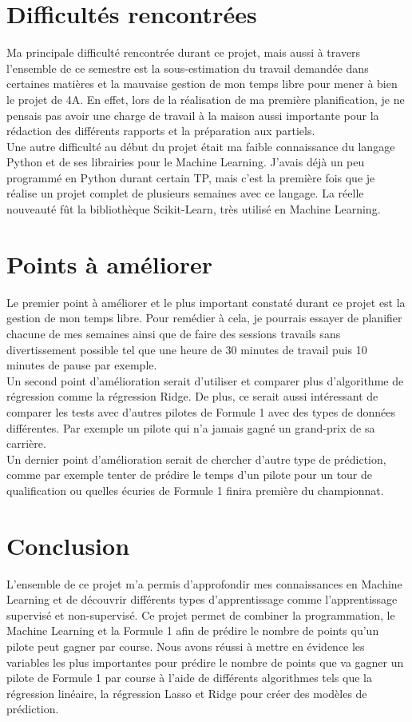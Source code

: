 \chapter{Difficultés rencontrées}
Ma principale difficulté rencontrée durant ce projet, mais aussi à travers l'ensemble de ce semestre est la sous-estimation du travail demandée dans certaines matières et la mauvaise gestion de mon temps libre pour mener à bien le projet de 4A. En effet, lors de la réalisation de ma première planification, je ne pensais pas avoir une charge de travail à la maison aussi importante pour la rédaction des différents rapports et la préparation aux partiels.\\ 

Une autre difficulté au début du projet était ma faible connaissance du langage Python et de ses librairies pour le Machine Learning. J'avais déjà un peu programmé en Python durant certain TP, mais c'est la première fois que je réalise un projet complet de plusieurs semaines avec ce langage. La réelle nouveauté fût la bibliothèque Scikit-Learn, très utilisé en Machine Learning. \\

\chapter{Points à améliorer}
Le premier point à améliorer et le plus important constaté durant ce projet est la gestion de mon temps libre. Pour remédier à cela, je pourrais essayer de planifier chacune de mes semaines ainsi que de faire des sessions travails sans divertissement possible tel que une heure de 30 minutes de travail puis 10 minutes de pause par exemple.\\

Un second point d'amélioration serait d'utiliser et comparer plus d'algorithme de régression comme la régression Ridge. De plus, ce serait aussi intéressant de comparer les tests avec d'autres pilotes de Formule 1 avec des types de données différentes. Par exemple un pilote qui n'a jamais gagné un grand-prix de sa carrière. \\

Un dernier point d'amélioration serait de chercher d'autre type de prédiction, comme par exemple tenter de prédire le temps d'un pilote pour un tour de qualification ou quelles écuries de Formule 1 finira première du championnat.



\chapter{Conclusion}
L'ensemble de ce projet m'a permis d'approfondir mes connaissances en Machine Learning et de découvrir différents types d'apprentissage comme l'apprentissage supervisé et non-supervisé. Ce projet permet de combiner la programmation, le Machine Learning et la Formule 1 afin de prédire le nombre de points qu'un pilote peut gagner par course. Nous avons réussi à mettre en évidence les variables les plus importantes pour prédire le nombre de points que va gagner un pilote de Formule 1 par course à l'aide de différents algorithmes tels que la régression linéaire, la régression Lasso et Ridge pour créer des modèles de prédiction.